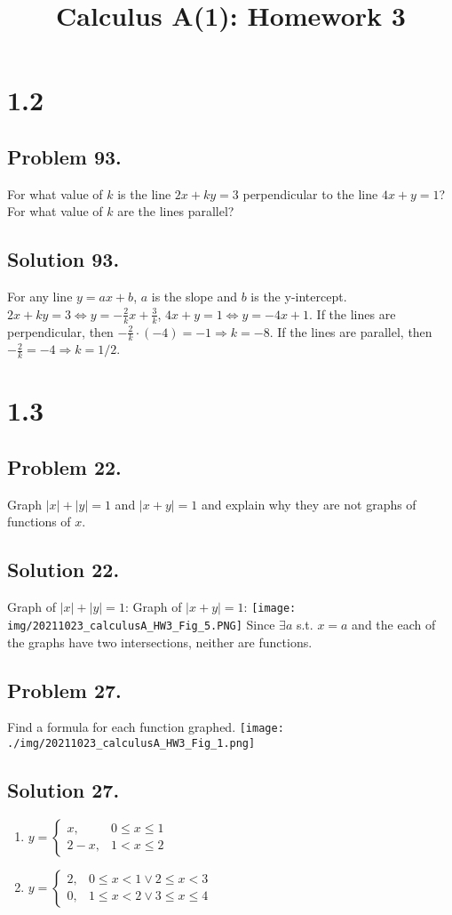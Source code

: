 \documentclass{article}
\title{Calculus A(1): Homework 3}
\begin{document}
\maketitle
\section*{1.2}
\subsection*{Problem 93.}
For what value of $k$ is the line $2x+ky=3$ perpendicular to the
line $4x+y=1$? For what value of $k$ are the lines parallel?
\subsection*{Solution 93.}
For any line $y=ax+b$, $a$ is the slope and $b$ is the y-intercept.
$2x+ky=3\Leftrightarrow y=-\frac{2}{k}x+\frac{3}{k}$, $4x+y=1\Leftrightarrow y=-4x+1$.\newline
If the lines are perpendicular, then $-\frac{2}{k}\cdot (-4)=-1\Rightarrow k=-8$.\newline
If the lines are parallel, then $-\frac{2}{k}=-4\Rightarrow k=1/2$.
\section*{1.3}
\subsection*{Problem 22.}
Graph $|x|+|y|=1$ and $|x+y|=1$ and explain why they are not graphs of functions of $x$.
\subsection*{Solution 22.}
Graph of $|x|+|y|=1$:    Graph of $|x+y|=1$:\newline
\texttt{[image: img/20211023\_calculusA\_HW3\_Fig\_5.PNG]}\newline
Since $\exists a$ s.t. $x=a$ and the each of the graphs have two intersections, neither are functions.
\subsection*{Problem 27.}
Find a formula for each function graphed.\newline
\texttt{[image: ./img/20211023\_calculusA\_HW3\_Fig\_1.png]}
\subsection*{Solution 27.}
\begin{enumerate}[label=(\alph*)]
    \item $y=\left\{\begin{array}{cc}x,&0\leq x\leq 1\\2-x,& 1<x\leq 2\end{array}\right.$
    \item $y=\left\{\begin{array}{cc}2,&0\leq x< 1\lor 2\leq x<3\\0,& 1\leq x< 2 \lor 3 \leq x \leq 4\end{array}\right.$
\end{enumerate}
\end{document}
